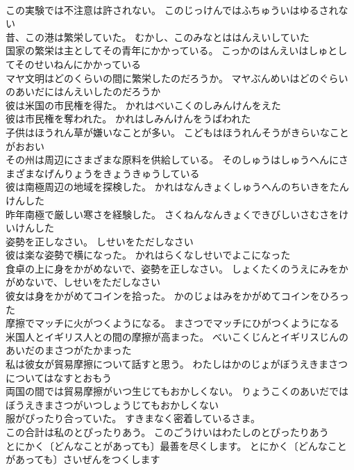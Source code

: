 \documentclass[8pt]{extreport}
\begin{document}
\begin{CJK}{UTF8}{min}
\\	この実験では不注意は許されない。	このじっけんではふちゅういはゆるされない 
\\	昔、この港は繁栄していた。	むかし、このみなとははんえいしていた 
\\	国家の繁栄は主としてその青年にかかっている。	こっかのはんえいはしゅとしてそのせいねんにかかっている 
\\	マヤ文明はどのくらいの間に繁栄したのだろうか。	マヤぶんめいはどのぐらいのあいだにはんえいしたのだろうか 
\\	彼は米国の市民権を得た。	かれはべいこくのしみんけんをえた 
\\	彼は市民権を奪われた。	かれはしみんけんをうばわれた 
\\	子供はほうれん草が嫌いなことが多い。	こどもはほうれんそうがきらいなことがおおい 
\\	その州は周辺にさまざまな原料を供給している。	そのしゅうはしゅうへんにさまざまなげんりょうをきょうきゅうしている 
\\	彼は南極周辺の地域を探検した。	かれはなんきょくしゅうへんのちいきをたんけんした 
\\	昨年南極で厳しい寒さを経験した。	さくねんなんきょくできびしいさむさをけいけんした 
\\	姿勢を正しなさい。	しせいをただしなさい 
\\	彼は楽な姿勢で横になった。	かれはらくなしせいでよこになった 
\\	食卓の上に身をかがめないで、姿勢を正しなさい。	しょくたくのうえにみをかがめないで、しせいをただしなさい 
\\	彼女は身をかがめてコインを拾った。	かのじょはみをかがめてコインをひろった 
\\	摩擦でマッチに火がつくようになる。	まさつでマッチにひがつくようになる 
\\	米国人とイギリス人との間の摩擦が高まった。	べいこくじんとイギリスじんのあいだのまさつがたかまった 
\\	私は彼女が貿易摩擦について話すと思う。	わたしはかのじょがぼうえきまさつについてはなすとおもう 
\\	両国の間では貿易摩擦がいつ生じてもおかしくない。	りょうこくのあいだではぼうえきまさつがいつしょうじてもおかしくない 
\\	服がぴったり合っていた。	すきまなく密着しているさま。
\\	この合計は私のとぴったりあう。	このごうけいはわたしのとぴったりあう 
\\	とにかく〔どんなことがあっても〕最善を尽くします。	とにかく〔どんなことがあっても〕さいぜんをつくします 

\end{CJK}
\end{document}
